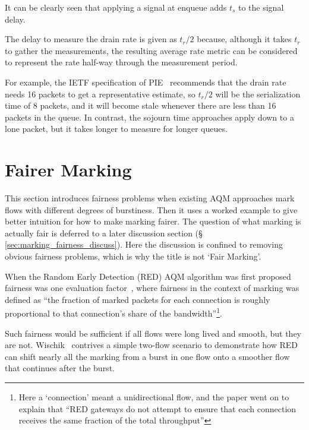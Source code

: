 It can be clearly seen that applying a signal at enqueue adds \(t_s\) to the signal delay.

The delay to measure the drain rate is given as \(t_r/2\) because, although it takes \(t_r\) to gather the measurements, the resulting average rate metric can be considered to represent the rate half-way through the measurement period.

For example, the IETF specification of PIE~\cite{Pan17:PIE} recommends that the drain rate needs 16 packets to get a representative estimate, so \(t_r/2\) will be the serialization time of 8 packets, and it will become stale whenever there are less than 16 packets in the queue. In contrast, the sojourn time approaches apply down to a lone packet, but it takes longer to measure for longer queues.

\section{Fairer Marking}\label{sec:fairer_marking}

This section introduces fairness problems when existing AQM approaches mark flows with different degrees of burstiness. Then it uses a worked example to give better intuition for how to make marking fairer. The question of what marking is actually fair is deferred to a later discussion section (\S\,\ref{sec:marking_fairness_discuss}). Here the discussion is confined to removing obvious fairness problems, which is why the title is not `Fair Marking'.

When the Random Early Detection (RED) AQM algorithm was first proposed fairness was one evaluation factor~\cite[\S\,8]{Floyd93:RED}, where fairness in the context of marking was defined as ``the fraction of marked packets for each connection is roughly proportional to that connection’s share of the bandwidth''\footnote{Here a `connection' meant a unidirectional flow, and the paper went on to explain that ``RED gateways do not attempt to ensure that each connection receives the same fraction of the total throughput''}.

Such fairness would be sufficient if all flows were long lived and smooth, but they are not.  Wischik~\cite{Wischik99:Mark_Fairly} contrives a simple two-flow scenario to demonstrate how RED can shift nearly all the marking from a burst in one flow onto a smoother flow that continues after the burst. %

